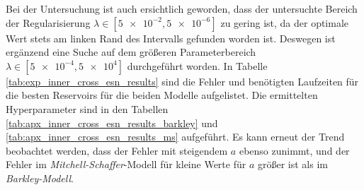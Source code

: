 Bei der Untersuchung ist auch ersichtlich geworden, dass der untersuchte Bereich der Regularisierung $\lambda \in [\num{5e-2},\num{5e-6}]$ zu gering ist, da der optimale Wert stets am linken Rand des Intervalls gefunden worden ist. Deswegen ist ergänzend eine Suche auf dem größeren Parameterbereich $\lambda \in [\num{5e-4},\num{5e+4}]$ durchgeführt worden.
In Tabelle \ref{tab:exp_inner_cross_esn_results} sind die Fehler und benötigten Laufzeiten für die besten Reservoirs für die beiden Modelle aufgelistet. Die ermittelten Hyperparameter sind in den Tabellen \ref{tab:apx_inner_cross_esn_results_barkley} und \ref{tab:apx_inner_cross_esn_results_ms} aufgeführt. Es kann erneut der Trend beobachtet werden, dass der Fehler mit steigendem $a$ ebenso zunimmt, und der Fehler im \textit{Mitchell-Schaffer}-Modell für kleine Werte für $a$ größer ist als im \textit{Barkley-Modell}.

